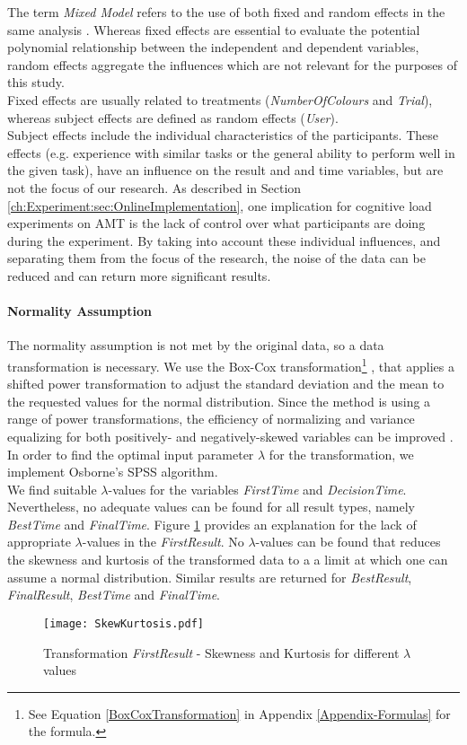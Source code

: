 The term \textit{Mixed Model} refers to the use of both fixed and random effects in the same analysis \citep{Seltman2012}. Whereas fixed effects are essential to evaluate the potential polynomial relationship between the independent and dependent variables, random effects aggregate the influences which are not relevant for the purposes of this study. \\ 
Fixed effects are usually related to treatments (\textit{NumberOfColours} and \textit{Trial}), whereas subject effects are defined as random effects (\textit{User}).\\
Subject effects include the individual characteristics of the participants. These effects (e.g. experience with similar tasks or the general ability to perform well in the given task), have an influence on the result and and time variables, but are not the focus of our research. As described in Section \ref{ch:Experiment:sec:OnlineImplementation}, one implication for cognitive load experiments on \acf{AMT} is the lack of control over what participants are doing during the experiment. By taking into account these individual influences, and separating them from the focus of the research, the noise of the data can be reduced and can return more significant results.

\paragraph{Normality Assumption}
The normality assumption is not met by the original data, so a data transformation is necessary.
We use the Box-Cox transformation\footnote{See Equation \ref{BoxCoxTransformation} in Appendix \ref{Appendix-Formulas} for the formula.} \citep{Sakia1992}, that applies a shifted power transformation to adjust the standard deviation and the mean to the requested values for the normal distribution. Since the method is using a range of power transformations, the efficiency of normalizing and variance equalizing for both positively- and negatively-skewed variables can be improved \citep{Osborne2010}. In order to find the optimal input parameter $\lambda$ for the transformation, we implement Osborne's SPSS algorithm. \\
We find suitable $\lambda$-values for the variables \textit{FirstTime} and \textit{DecisionTime}. Nevertheless, no adequate values can be found for all result types, namely \textit{BestTime} and \textit{FinalTime}.
Figure \ref{fig:SkewKurtosis} provides an explanation for the lack of appropriate $\lambda$-values in the \textit{FirstResult}. No $\lambda$-values can be found that reduces the skewness and kurtosis of the transformed data to a a limit at which one can assume a normal distribution. Similar results are returned for \textit{BestResult}, \textit{FinalResult}, \textit{BestTime} and \textit{FinalTime}.
\begin{figure}[htbp] %
\begin{center} 
\texttt{[image: SkewKurtosis.pdf]}
  \caption{Transformation \textit{FirstResult} - Skewness and Kurtosis for different $\lambda$ values}
    \label{fig:SkewKurtosis} 
\end{center}
\end{figure}

